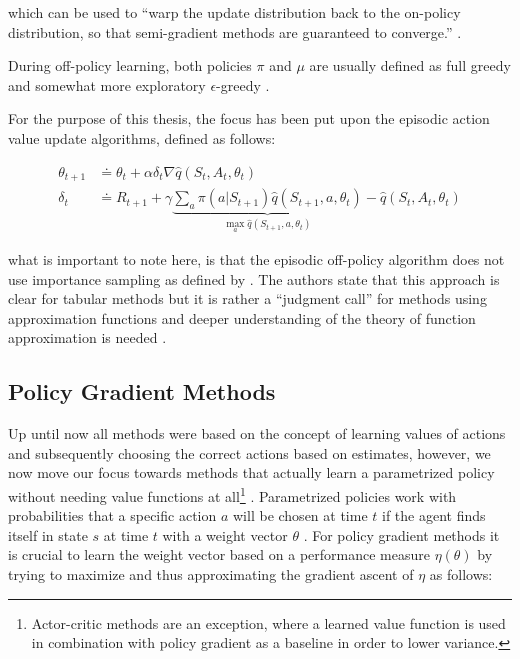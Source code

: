 \documentclass{seal_thesis}
\begin{document}
which can be used to ``warp the update distribution back to the on-policy distribution, so that semi-gradient methods are guaranteed to converge.'' \cite[p. 243]{Sutton2017}.

During off-policy learning, both policies $\pi$ and $\mu$ are usually defined as full greedy and somewhat more exploratory $\epsilon$-greedy \cite[p. 243]{Sutton2017}.

For the purpose of this thesis, the focus has been put upon the episodic action value update algorithms, defined as follows:

\begin{align}
	\theta_{t+1} &\doteq \theta_t + \alpha \delta_t \nabla \hat{q} (S_t,A_t,\theta_t)\\
	\delta_t &\doteq R_{t+1} + \gamma \underbrace{\sum_a \pi (a|S_{t+1}) \hat{q} (S_{t+1},a,\theta_t)}_{\max_a \hat{q} (S_{t+1},a,\theta_t)} - \hat{q} (S_t,A_t,\theta_t)
\end{align}

what is important to note here, is that the episodic off-policy algorithm does not use importance sampling as defined by  \cite[p. 244]{Sutton2017}. The authors state that this approach is clear for tabular methods but it is rather a ``judgment call'' for methods using approximation functions and deeper understanding of the theory of function approximation is needed \cite[p. 244]{Sutton2017}.

\subsection{Policy Gradient Methods}
\label{subsec:polgrad_methods}

Up until now all methods were based on the concept of learning values of actions and subsequently choosing the correct actions based on estimates, however, we now move our focus towards methods that actually learn a parametrized policy without needing value functions at all\footnote{Actor-critic methods are an exception, where a learned value function is used in combination with policy gradient as a baseline in order to lower variance.}  \cite[p. 265]{Sutton2017}. Parametrized policies work with probabilities that a specific action $a$ will be chosen at time $t$ if the agent finds itself in state $s$ at time $t$ with a weight vector $\theta$ \cite[p. 265]{Sutton2017}. For policy gradient methods it is crucial to learn the weight vector based on a performance measure $\eta(\theta)$ by trying to maximize and thus approximating the gradient ascent of $\eta$ as follows:
\end{document}

